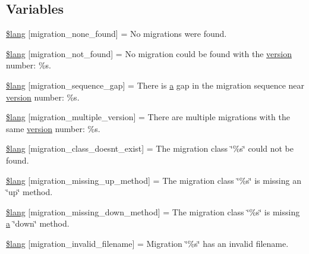 \subsection*{Variables}
\begin{DoxyCompactItemize}
\item 
\hyperlink{migration__lang_8php_affa6337f0973de810b3c61491deae6b1}{\$lang} \mbox{[}\textquotesingle{}migration\+\_\+none\+\_\+found\textquotesingle{}\mbox{]} = \textquotesingle{}No migrations were found.\textquotesingle{}
\item 
\hyperlink{migration__lang_8php_a92dd777422d70950993d43f4d0c31b1b}{\$lang} \mbox{[}\textquotesingle{}migration\+\_\+not\+\_\+found\textquotesingle{}\mbox{]} = \textquotesingle{}No migration could be found with the \hyperlink{assets_2js_2bootstrap_8js_a614229fff4211edebc3c193d1e7763ec}{version} number\+: \%s.\textquotesingle{}
\item 
\hyperlink{migration__lang_8php_ab1f43d98bc1365f4b753d783a8802697}{\$lang} \mbox{[}\textquotesingle{}migration\+\_\+sequence\+\_\+gap\textquotesingle{}\mbox{]} = \textquotesingle{}There is \hyperlink{assets_2js_2bootstrap_8min_8js_a1f5870dcf487187f13d5fd328ed9e6e7}{a} gap in the migration sequence near \hyperlink{assets_2js_2bootstrap_8js_a614229fff4211edebc3c193d1e7763ec}{version} number\+: \%s.\textquotesingle{}
\item 
\hyperlink{migration__lang_8php_a1a98130d04f280e6a5f6f509179f9e01}{\$lang} \mbox{[}\textquotesingle{}migration\+\_\+multiple\+\_\+version\textquotesingle{}\mbox{]} = \textquotesingle{}There are multiple migrations with the same \hyperlink{assets_2js_2bootstrap_8js_a614229fff4211edebc3c193d1e7763ec}{version} number\+: \%s.\textquotesingle{}
\item 
\hyperlink{migration__lang_8php_a141dceda5b8294f6e4ddf7e5da6fe71d}{\$lang} \mbox{[}\textquotesingle{}migration\+\_\+class\+\_\+doesnt\+\_\+exist\textquotesingle{}\mbox{]} = \textquotesingle{}The migration class \char`\"{}\%s\char`\"{} could not be found.\textquotesingle{}
\item 
\hyperlink{migration__lang_8php_a4bc9c60a4f078d1845d1d72370c363e8}{\$lang} \mbox{[}\textquotesingle{}migration\+\_\+missing\+\_\+up\+\_\+method\textquotesingle{}\mbox{]} = \textquotesingle{}The migration class \char`\"{}\%s\char`\"{} is missing an \char`\"{}up\char`\"{} method.\textquotesingle{}
\item 
\hyperlink{migration__lang_8php_a6e835ce0b327b8ea1df42bfc7a59f1cd}{\$lang} \mbox{[}\textquotesingle{}migration\+\_\+missing\+\_\+down\+\_\+method\textquotesingle{}\mbox{]} = \textquotesingle{}The migration class \char`\"{}\%s\char`\"{} is missing \hyperlink{assets_2js_2bootstrap_8min_8js_a1f5870dcf487187f13d5fd328ed9e6e7}{a} \char`\"{}down\char`\"{} method.\textquotesingle{}
\item 
\hyperlink{migration__lang_8php_a75ef7572f25674e4dd1e36a0d61080fa}{\$lang} \mbox{[}\textquotesingle{}migration\+\_\+invalid\+\_\+filename\textquotesingle{}\mbox{]} = \textquotesingle{}Migration \char`\"{}\%s\char`\"{} has an invalid filename.\textquotesingle{}
\end{DoxyCompactItemize}


